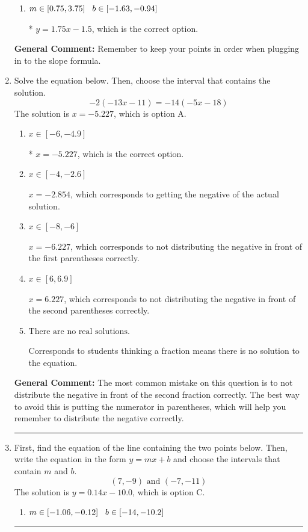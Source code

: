 \documentclass{extbook}[14pt]
\newcommand{\litem}[1]{\item #1

\rule{\textwidth}{0.4pt}}
\begin{document}
\begin{enumerate}
{\begin{enumerate}[label=\Alph*.]
 $y = 1.75x + 3$, which corresponds to using the correct slope/equation but not distributing correctly using the second point.
\item \( m \in [0.75, 3.75] \hspace*{3mm} b \in [-1.63, -0.94] \)

* $y = 1.75x -1.5$, which is the correct option.
\end{enumerate}

\textbf{General Comment:} Remember to keep your points in order when plugging in to the slope formula.
}
\litem{
Solve the equation below. Then, choose the interval that contains the solution.
\[ -2(-13x -11) = -14(-5x -18) \]The solution is \( x = -5.227 \), which is option A.\begin{enumerate}[label=\Alph*.]
\item \( x \in [-6, -4.9] \)

* $x = -5.227$, which is the correct option.
\item \( x \in [-4, -2.6] \)

$x = -2.854$, which corresponds to getting the negative of the actual solution.
\item \( x \in [-8, -6] \)

$x = -6.227$, which corresponds to not distributing the negative in front of the first parentheses correctly.
\item \( x \in [6, 6.9] \)

$x = 6.227$, which corresponds to not distributing the negative in front of the second parentheses correctly.
\item \( \text{There are no real solutions.} \)

Corresponds to students thinking a fraction means there is no solution to the equation.
\end{enumerate}

\textbf{General Comment:} The most common mistake on this question is to not distribute the negative in front of the second fraction correctly. The best way to avoid this is putting the numerator in parentheses, which will help you remember to distribute the negative correctly.
}
\litem{
First, find the equation of the line containing the two points below. Then, write the equation in the form $ y=mx+b $ and choose the intervals that contain $m$ and $b$.
\[ (7, -9) \text{ and } (-7, -11) \]The solution is \( y = 0.14x -10.0 \), which is option C.\begin{enumerate}[label=\Alph*.]
\item \( m \in [-1.06, -0.12] \hspace*{3mm} b \in [-14, -10.2] \)


\end{enumerate}}
\end{enumerate}
\end{document}
